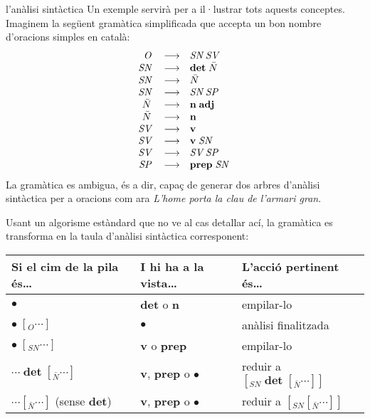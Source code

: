 \begin{persabermes}{l'anàlisi sintàctica}
  Un exemple servirà per a il·lustrar tots aquests conceptes. Imaginem
  la següent gramàtica simplificada que accepta un bon nombre
  d'oracions simples en català\label{pg:gramsenz}:
  $$
  \begin{array}{rcl}
  \mbox{\em O}\; &\longrightarrow & \mbox{\em SN}\; \mbox{\em SV}\; \\
  \mbox{\em SN}\; &\longrightarrow & \mbox{\bf det}\; \mbox{\em $\bar{N}$}\; \\
  \mbox{\em SN}\; &\longrightarrow & \mbox{\em $\bar{N}$}\; \\
  \mbox{\em SN}\; &\longrightarrow & \mbox{\em SN}\; \mbox{\em SP}\; \\
  \mbox{\em $\bar{N}$}\; &\longrightarrow & \mbox{\bf n}\; \mbox{\bf adj}\; \\
  \mbox{\em $\bar{N}$}\; &\longrightarrow & \mbox{\bf n}\; \\
  \mbox{\em SV}\; &\longrightarrow & \mbox{\bf v}\; \\
  \mbox{\em SV}\; &\longrightarrow & \mbox{\bf v}\; \mbox{\em SN}\; \\
  \mbox{\em SV}\; &\longrightarrow & \mbox{\em SV}\; \mbox{\em SP}\; \\
  \mbox{\em SP}\; &\longrightarrow & \mbox{\bf prep}\; \mbox{\em SN}\; \\
  \end{array}
  $$
  La gramàtica es ambigua, és a dir, capaç de generar dos arbres
  d'anàlisi sintàctica per a oracions com ara \emph{L'home porta la
    clau de l'armari gran}.

  Usant un algorisme estàndard que no ve al cas detallar ací, la
  gramàtica es transforma en la taula d'anàlisi sintàctica
  corresponent:

  \begin{center}
    \begin{tabular}{l|l|l}
      \hline
      \textsf{Si el cim de la pila és\ldots} & \textsf{I hi ha a la vista\ldots} & \textsf{L'acció pertinent
        és\ldots} \\
      \hline
      $\bullet$             & \textbf{det} o \textbf{n} & empilar-lo \\
      \hline
      $\bullet\; [_O \cdots ]$ & $\bullet$ & anàlisi finalitzada \\
      \hline 
      $\bullet\; [_{SN} \cdots ]$  & \textbf{v} o \textbf{prep} & empilar-lo \\

      \hline
  
      $\cdots\; \textbf{det} \; [_{\bar{N}} \cdots ]$  & \textbf{v},
      \textbf{prep} o $\bullet$ &reduir a $[_{SN}\;
      \textbf{det}\;[_{\bar{N}} \cdots ] ]$ \\
      \hline
      $\cdots [_{\bar{N}} \cdots ]$ (sense \textbf{det})  & \textbf{v}, \textbf{prep}
      o $\bullet$ & reduir a $[_{SN}
      [_{\bar{N}} \cdots ] ]$ \\


\end{tabular}
\end{center}
\end{persabermes}
